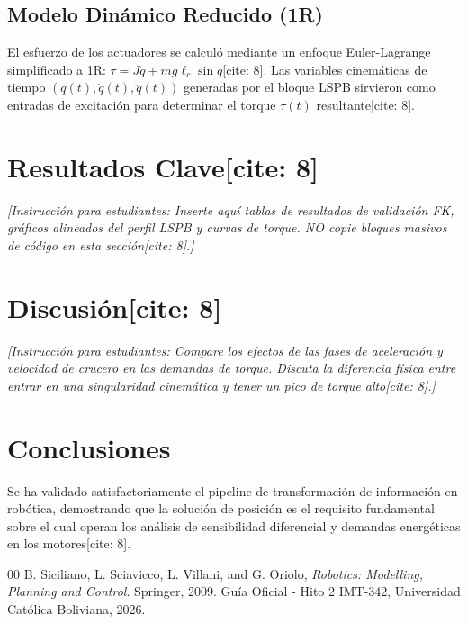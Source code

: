 \documentclass[conference]{IEEEtran}
\begin{document}
\subsection{Modelo Dinámico Reducido (1R)}
El esfuerzo de los actuadores se calculó mediante un enfoque Euler-Lagrange simplificado a 1R: $\tau = J\ddot{q} + mg\ell_c\sin q$[cite: 8]. Las variables cinemáticas de tiempo $(q(t), \dot{q}(t), \ddot{q}(t))$ generadas por el bloque LSPB sirvieron como entradas de excitación para determinar el torque $\tau(t)$ resultante[cite: 8].

\section{Resultados Clave[cite: 8]}
\textit{[Instrucción para estudiantes: Inserte aquí tablas de resultados de validación FK, gráficos alineados del perfil LSPB y curvas de torque. NO copie bloques masivos de código en esta sección[cite: 8].]}

\section{Discusión[cite: 8]}
\textit{[Instrucción para estudiantes: Compare los efectos de las fases de aceleración y velocidad de crucero en las demandas de torque. Discuta la diferencia física entre entrar en una singularidad cinemática y tener un pico de torque alto[cite: 8].]}

\section{Conclusiones}
Se ha validado satisfactoriamente el pipeline de transformación de información en robótica, demostrando que la solución de posición es el requisito fundamental sobre el cual operan los análisis de sensibilidad diferencial y demandas energéticas en los motores[cite: 8].

\begin{thebibliography}{00}
 B. Siciliano, L. Sciavicco, L. Villani, and G. Oriolo, \textit{Robotics: Modelling, Planning and Control}. Springer, 2009.
 Guía Oficial - Hito 2 IMT-342, Universidad Católica Boliviana, 2026.
\end{thebibliography}
\end{document}
